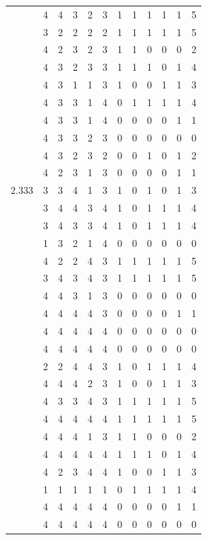 \documentclass[]{book}
\theoremstyle{definition}
\theoremstyle{definition}
\theoremstyle{definition}
\theoremstyle{remark}
\begin{document}
\begin{table}
{\begin{tabular}[t]{rrrrrrrrrrrr}
 & 4 & 4 & 3 & 2 & 3 & 1 & 1 & 1 & 1 & 1 & 5\\
 & 3 & 2 & 2 & 2 & 2 & 1 & 1 & 1 & 1 & 1 & 5\\
 & 4 & 2 & 3 & 2 & 3 & 1 & 1 & 0 & 0 & 0 & 2\\
 & 4 & 3 & 2 & 3 & 3 & 1 & 1 & 1 & 0 & 1 & 4\\
 & 4 & 3 & 1 & 1 & 3 & 1 & 0 & 0 & 1 & 1 & 3\\
 & 4 & 3 & 3 & 1 & 4 & 0 & 1 & 1 & 1 & 1 & 4\\
 & 4 & 3 & 3 & 1 & 4 & 0 & 0 & 0 & 0 & 1 & 1\\
 & 4 & 3 & 3 & 2 & 3 & 0 & 0 & 0 & 0 & 0 & 0\\
 & 4 & 3 & 2 & 3 & 2 & 0 & 0 & 1 & 0 & 1 & 2\\
 & 4 & 2 & 3 & 1 & 3 & 0 & 0 & 0 & 0 & 1 & 1\\
2.333 & 3 & 3 & 4 & 1 & 3 & 1 & 0 & 1 & 0 & 1 & 3\\
 & 3 & 4 & 4 & 3 & 4 & 1 & 0 & 1 & 1 & 1 & 4\\
 & 3 & 4 & 3 & 3 & 4 & 1 & 0 & 1 & 1 & 1 & 4\\
 & 1 & 3 & 2 & 1 & 4 & 0 & 0 & 0 & 0 & 0 & 0\\
 & 4 & 2 & 2 & 4 & 3 & 1 & 1 & 1 & 1 & 1 & 5\\
 & 3 & 4 & 3 & 4 & 3 & 1 & 1 & 1 & 1 & 1 & 5\\
 & 4 & 4 & 3 & 1 & 3 & 0 & 0 & 0 & 0 & 0 & 0\\
 & 4 & 4 & 4 & 4 & 3 & 0 & 0 & 0 & 0 & 1 & 1\\
 & 4 & 4 & 4 & 4 & 4 & 0 & 0 & 0 & 0 & 0 & 0\\
 & 4 & 4 & 4 & 4 & 4 & 0 & 0 & 0 & 0 & 0 & 0\\
 & 2 & 2 & 4 & 4 & 3 & 1 & 0 & 1 & 1 & 1 & 4\\
 & 4 & 4 & 4 & 2 & 3 & 1 & 0 & 0 & 1 & 1 & 3\\
 & 4 & 3 & 3 & 4 & 3 & 1 & 1 & 1 & 1 & 1 & 5\\
 & 4 & 4 & 4 & 4 & 4 & 1 & 1 & 1 & 1 & 1 & 5\\
 & 4 & 4 & 4 & 1 & 3 & 1 & 1 & 0 & 0 & 0 & 2\\
 & 4 & 4 & 4 & 4 & 4 & 1 & 1 & 1 & 0 & 1 & 4\\
 & 4 & 2 & 3 & 4 & 4 & 1 & 0 & 0 & 1 & 1 & 3\\
 & 1 & 1 & 1 & 1 & 1 & 0 & 1 & 1 & 1 & 1 & 4\\
 & 4 & 4 & 4 & 4 & 4 & 0 & 0 & 0 & 0 & 1 & 1\\
 & 4 & 4 & 4 & 4 & 4 & 0 & 0 & 0 & 0 & 0 & 0\\

\end{tabular}}
\end{table}
\end{document}
